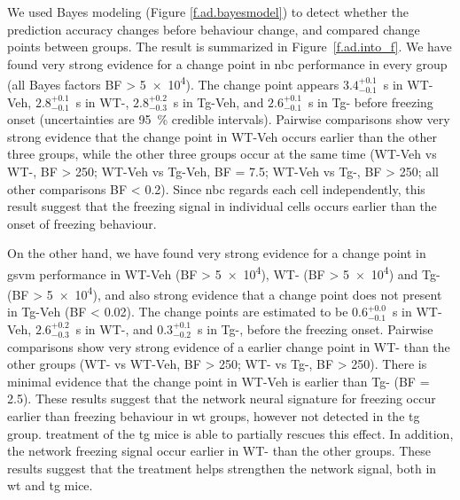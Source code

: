 We used Bayes modeling (Figure \ref{f.ad.bayesmodel}) to detect whether the prediction accuracy changes before behaviour change, and compared change points between groups. The result is summarized in Figure~\ref{f.ad.into_f}. We have found very strong evidence for a change point in \gls{nbc} performance in every group (all Bayes factors BF > \num{5e4}). The change point appears $3.4_{-0.1}^{+0.1}$\SI{}{\s} in WT-Veh, $2.8_{-0.1}^{+0.1}$\SI{}{\second} in WT-\glu, $2.8_{-0.3}^{+0.2}$\SI{}{\second} in Tg-Veh, and $2.6_{-0.1}^{+0.1}$\SI{}{\second} in Tg-\glu{} before freezing onset (uncertainties are \SI{95}{\percent} credible intervals). Pairwise comparisons show very strong evidence that the change point in WT-Veh occurs earlier than the other three groups, while the other three groups occur at the same time (WT-Veh vs WT-\glu, BF > \num{250}; WT-Veh vs Tg-Veh, BF = \num{7.5}; WT-Veh vs Tg-\glu, BF > \num{250}; all other comparisons BF < \num{0.2}). Since \gls{nbc} regards each cell independently, this result suggest that the freezing signal in individual cells occurs earlier than the onset of freezing behaviour.

On the other hand,  we have found very strong evidence for a change point in \gls{gsvm} performance in WT-Veh (BF > \num{5e4}), WT-\glu{} (BF > \num{5e4}) and Tg-\glu{} (BF > \num{5e4}), and also strong evidence that a change point does not present in Tg-Veh (BF < \num{0.02}). The change points are estimated to be $0.6_{-0.1}^{+0.0}$\SI{}{\s} in WT-Veh, $2.6_{-0.3}^{+0.2}$\SI{}{\second} in WT-\glu, and $0.3_{-0.2}^{+0.1}$\SI{}{\s} in Tg-\glu, before the freezing onset. Pairwise comparisons show very strong evidence of a earlier change point in WT-\glu{} than the other groups (WT-\glu{} vs WT-Veh, BF > \num{250}; WT-\glu{} vs Tg-\glu, BF > \num{250}). There is minimal evidence that the change point in WT-Veh is earlier than Tg-\glu{} (BF = \num{2.5}). These results suggest that the network neural signature for freezing occur earlier than freezing behaviour in \gls{wt} groups, however not detected in the \gls{tg} group. \tglu{} treatment of the \gls{tg} mice is able to partially rescues this effect. In addition, the network freezing signal occur earlier in WT-\glu{} than the other groups. These results suggest that the \tglu{} treatment helps strengthen the network signal, both in \gls{wt} and \gls{tg} mice. 


